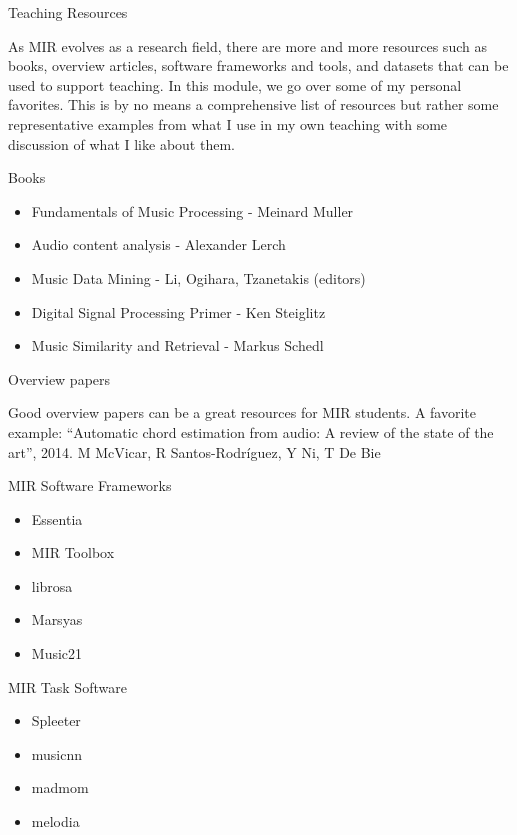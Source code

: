 \documentclass[12pt]{beamer}
\begin{document}
\begin{frame}{Teaching Resources}

  As MIR evolves as a research field, there are more and more
  resources such as books, overview articles, software frameworks and
  tools, and datasets that can be used to support teaching. In this module,
  we go over some of my personal favorites. This is by no means a comprehensive
  list of resources but rather some representative examples from what I use
  in my own teaching with some discussion of what I like about them. 

  \end{frame} 


\begin{frame}{Books}
  \begin{itemize}
    \item Fundamentals of Music Processing - Meinard Muller 
    \item Audio content analysis - Alexander Lerch
    \item Music Data Mining - Li, Ogihara, Tzanetakis (editors) 
    \item Digital Signal Processing Primer - Ken Steiglitz
    \item Music Similarity and Retrieval - Markus Schedl
    \end{itemize}
\end{frame}

\begin{frame}{Overview papers}

  Good overview papers can be a great resources for MIR students.
  A favorite example:
  ``Automatic chord estimation from audio: A review of the state of the art'', 2014. M McVicar, R Santos-Rodríguez, Y Ni, T De Bie

  

\end{frame} 

\begin{frame}{MIR Software Frameworks}
  \begin{itemize}
  \item{Essentia}
  \item{MIR Toolbox}
  \item{librosa}
  \item{Marsyas}
  \item{Music21} 
  \end{itemize}
  
\end{frame}

\begin{frame}{MIR Task Software}
  \begin{itemize}
  \item{Spleeter}
  \item{musicnn}
  \item{madmom}
  \item{melodia}
  \end{itemize} 
\end{frame}
\end{document}
